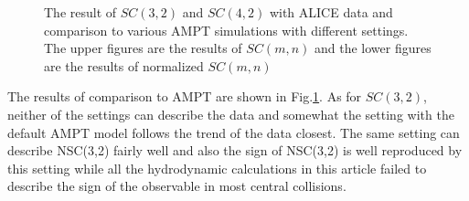 \begin{figure}[!p]
\begin{center}
        \caption{The result of  $SC(3,2)$ and $SC(4,2)$ with ALICE data and comparison to various AMPT simulations with different settings.  The upper figures are the results of $SC(m,n)$ and the lower figures are the results of normalized $SC(m,n)$}
        \label{AMPTcomLowSC}
        \end{center}   
     \end{figure}

The results of comparison to AMPT are shown in Fig.\ref{AMPTcomLowSC}. As for $SC(3,2)$, neither of the settings can describe the data and somewhat the setting with the default AMPT model follows the trend of the data closest. The same setting can describe NSC(3,2) fairly well and also the sign of NSC(3,2) is well reproduced by this setting while all the hydrodynamic calculations in this article failed to describe the sign of the observable in most central collisions.

